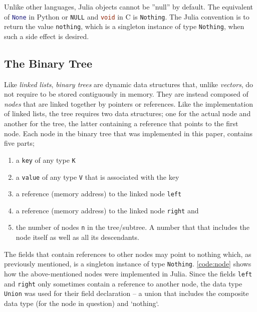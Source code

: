 \documentclass[a4paper, 11pt]{article}
\begin{document}
    Unlike other languages, Julia objects cannot be ''null'' by default. The
    equivalent of \lstinline[language=Python]{None} in Python or
    \lstinline[language=C]{NULL} and \lstinline[language=C]{void} in C is
    \texttt{Nothing}. The Julia convention is to return the value
    \texttt{nothing}, which is a singleton instance of type
    \texttt{Nothing}, when such a side effect is
    desired. 

    \clearpage
    \subsection*{The Binary Tree}
    \label{sec:thebinarytree}
    Like \emph{linked lists}, \emph{binary trees} are dynamic data structures that, unlike \emph{vectors}, 
    do not require to be stored contiguously in memory. They are instead composed of \emph{nodes} 
    that are linked together by pointers or references. 
    Like the implementation of linked lists, the tree requires two data structures; one
    for the actual node and another for the tree, the latter containing a
    reference that points to the first node. 
    Each node in the binary tree that was implemented in this paper, contains five parts;
    \begin{enumerate}[itemsep=1pt]
        \item a \texttt{key} of any type \texttt{K}
        \item a \texttt{value} of any type \texttt{V} 
        that is associated with the key
        \item a reference (memory address) to the linked node \texttt{left}
        \item a reference (memory address) to the linked node \texttt{right} and
        \item the number of nodes \texttt{n} in the tree/subtree. 
        A number that that includes the node itself as well as all its descendants.
    \end{enumerate}

    The fields that contain references to other nodes may point to nothing 
    which, as previously mentioned, is a singleton instance of type \texttt{Nothing}.
    \autoref{code:node} shows how the above-mentioned nodes were implemented in Julia. 
    Since the fields \texttt{left} and \texttt{right} only sometimes 
    contain a reference to another node, the data type \texttt{Union} was used for their 
    field declaration -- a union that includes the composite
    data type (for the node in question) and `nothing`.
\end{document}
